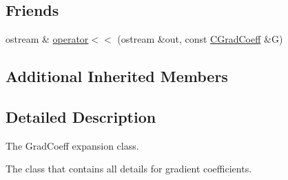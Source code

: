 \subsection*{Friends}
\begin{DoxyCompactItemize}
\item 
ostream \& \hyperlink{classCGradCoeff_a81f3ceab707183d2313bf86d44b71476}{operator$<$$<$} (ostream \&out, const \hyperlink{classCGradCoeff}{C\-Grad\-Coeff} \&G)
\end{DoxyCompactItemize}
\subsection*{Additional Inherited Members}


\subsection{Detailed Description}
The Grad\-Coeff expansion class. 

The class that contains all details for gradient coefficients. 

